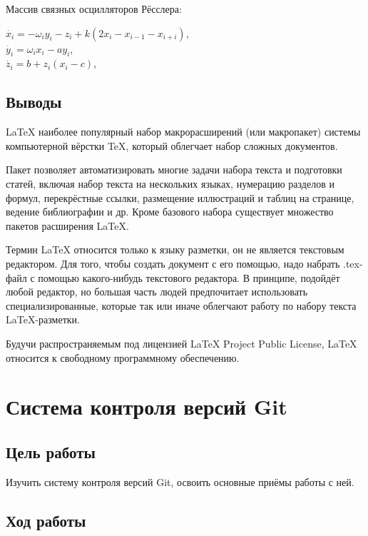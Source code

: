\documentclass[a4paper, 12pt]{article}		%
\begin{document}
Массив связных осцилляторов Рёсслера:
\begin{center}
$\dot{x_i} = -\omega_iy_i - z_i +k(2x_i - x_{i-1} - x_{i+i})$,\\
$\dot{y_i} = \omega_ix_i - ay_i$,\\
$\dot{z_i} = b + z_i(x_i - c)$,
\end{center}


\subsection{Выводы}

\LaTeX{} наиболее популярный набор макрорасширений (или макропакет) системы компьютерной вёрстки \TeX{}, который облегчает набор сложных документов.

Пакет позволяет автоматизировать многие задачи набора текста и подготовки статей, включая набор текста на нескольких языках, нумерацию разделов и формул, перекрёстные ссылки, размещение иллюстраций и таблиц на странице, ведение библиографии и др. Кроме базового набора существует множество пакетов расширения \LaTeX{}.

Термин \LaTeX{} относится только к языку разметки, он не является текстовым редактором. Для того, чтобы создать документ с его помощью, надо набрать .tex-файл с помощью какого-нибудь текстового редактора. В принципе, подойдёт любой редактор, но большая часть людей предпочитает использовать специализированные, которые так или иначе облегчают работу по набору текста \LaTeX{}-разметки.

Будучи распространяемым под лицензией LaTeX Project Public License, \LaTeX{} относится к свободному программному обеспечению.

\newpage
\section{Система контроля версий Git}

\subsection{Цель работы}
Изучить систему контроля версий Git, освоить основные приёмы работы с ней.

\subsection{Ход работы}
\end{document}
